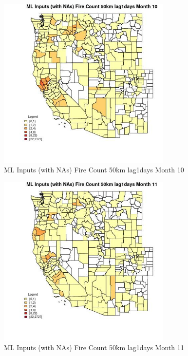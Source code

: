 \begin{figure} 
\centering  
\includegraphics[width=0.77\textwidth]{Code_Outputs/Report_ML_input_PM25_Step4_part_f_de_duplicated_aveswNAs_CountyFire_Count_50km_lag1daysmedianMonth10.jpg} 
\caption{\label{fig:Report_ML_input_PM25_Step4_part_f_de_duplicated_aveswNAsCountyFire_Count_50km_lag1daysmedianMonth10}ML Inputs (with NAs) Fire Count 50km lag1days Month 10} 
\end{figure} 
 

\clearpage 

\begin{figure} 
\centering  
\includegraphics[width=0.77\textwidth]{Code_Outputs/Report_ML_input_PM25_Step4_part_f_de_duplicated_aveswNAs_CountyFire_Count_50km_lag1daysmedianMonth11.jpg} 
\caption{\label{fig:Report_ML_input_PM25_Step4_part_f_de_duplicated_aveswNAsCountyFire_Count_50km_lag1daysmedianMonth11}ML Inputs (with NAs) Fire Count 50km lag1days Month 11} 
\end{figure} 
 

